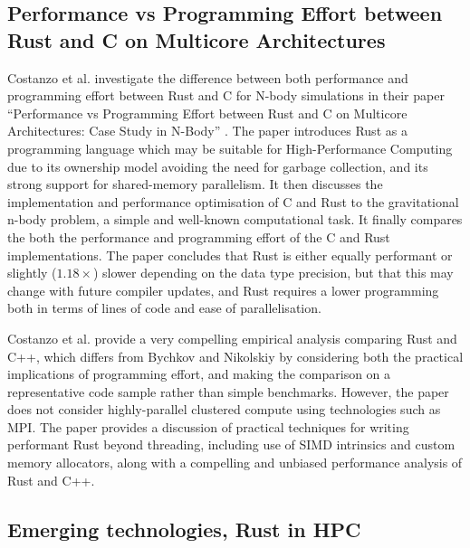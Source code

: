 

\subsection{Performance vs Programming Effort between Rust and C on Multicore Architectures}
\label{ssec:costanzo-et-al}

Costanzo et al. investigate the difference between both performance and programming effort between Rust and C for N-body simulations in their paper ``Performance vs Programming Effort between Rust and C on Multicore Architectures: Case Study in N-Body'' \cite{costanzoPerformanceVsProgramming2021}. The paper introduces Rust as a programming language which may be suitable for High-Performance Computing due to its ownership model avoiding the need for garbage collection, and its strong support for shared-memory parallelism. It then discusses the implementation and performance optimisation of C and Rust to the gravitational n-body problem, a simple and well-known computational task. It finally compares the both the performance and programming effort of the C and Rust implementations. The paper concludes that Rust is either equally performant or slightly ($1.18\times$) slower depending on the data type precision, but that this may change with future compiler updates, and Rust requires a lower programming both in terms of lines of code and ease of parallelisation.

Costanzo et al. provide a very compelling empirical analysis comparing Rust and C++, which differs from Bychkov and Nikolskiy by considering both the practical implications of programming effort, and making the comparison on a representative code sample rather than simple benchmarks. However, the paper does not consider highly-parallel clustered compute using technologies such as MPI. The paper provides a discussion of practical techniques for writing performant Rust beyond threading, including use of SIMD intrinsics and custom memory allocators, along with a compelling and unbiased performance analysis of Rust and C++.


\subsection{Emerging technologies, Rust in HPC}
\label{ssec:moran-bull}

